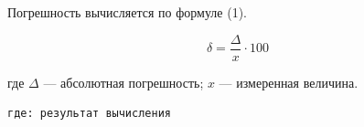 Погрешность вычисляется по формуле (1).

\begin{equation}
  \delta = \frac{\Delta}{x} \cdot 100
\end{equation}

где $\Delta$ — абсолютная погрешность;
$x$ — измеренная величина.

\begin{lstlisting}
где: результат вычисления
\end{lstlisting}
